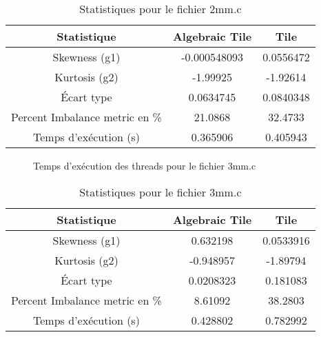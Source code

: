 \documentclass{article}
\begin{document}
\begin{table}[htbp]
  \centering
  \caption{Statistiques pour le fichier 2mm.c}
  \begin{tabular}{|c|c|c|}
    \hline
    Statistique & Algebraic Tile & Tile \\ 
    \hline
    Skewness (g1) & -0.000548093 & 0.0556472 \\ 
    Kurtosis (g2) & -1.99925 & -1.92614 \\ 
    Écart type & 0.0634745 & 0.0840348 \\ 
    Percent Imbalance metric en \% & 21.0868 & 32.4733 \\ 
    Temps d'exécution (s) &  0.365906      &  0.405943    \\ 
    \hline
  \end{tabular}
\end{table}
\newpage

\begin{figure}
  \centering
  \caption{Temps d'exécution des threads pour le fichier 3mm.c}
  \label{fig:3mm.c}
\end{figure}

\begin{table}[htbp]
  \centering
  \caption{Statistiques pour le fichier 3mm.c}
  \begin{tabular}{|c|c|c|}
    \hline
    Statistique & Algebraic Tile & Tile \\ 
    \hline
    Skewness (g1) & 0.632198 & 0.0533916 \\ 
    Kurtosis (g2) & -0.948957 & -1.89794 \\ 
    Écart type & 0.0208323 & 0.181083 \\ 
    Percent Imbalance metric en \% & 8.61092 & 38.2803 \\ 
    Temps d'exécution (s) &  0.428802      &  0.782992    \\ 
    \hline
  \end{tabular}
\end{table}
\newpage
\end{document}

